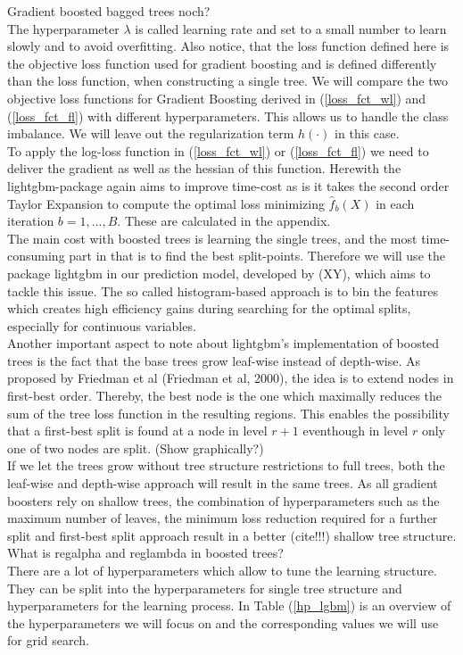 \documentclass[12pt,titlepage]{article}
\begin{document}
Gradient boosted bagged trees noch? \\

The hyperparameter $\lambda$ is called learning rate and set to a small number to learn slowly and to avoid overfitting. Also notice, that the loss function defined here is the objective loss function used for gradient boosting and is defined differently than the loss function, when constructing a single tree. We will compare the two objective loss functions for Gradient Boosting derived in (\ref{loss_fct_wl}) and (\ref{loss_fct_fl}) with different hyperparameters. This allows us to handle the class imbalance. We will leave out the regularization term $h(\cdot)$ in this case.\\
To apply the log-loss function in (\ref{loss_fct_wl}) or (\ref{loss_fct_fl}) we need to deliver the gradient as well as the hessian of this function. Herewith the lightgbm-package again aims to improve time-cost as is it takes the second order Taylor Expansion to compute the optimal loss minimizing $\hat{f}_{b}(X)$ in each iteration $b=1,...,B$. These are calculated in the appendix. \\
The main cost with boosted trees is learning the single trees, and the most time-consuming part in that is to find the best split-points. Therefore we will use the package lightgbm in our prediction model, developed by (XY), which aims to tackle this issue. The so called histogram-based approach is to bin the features which creates high efficiency gains during searching for the optimal splits, especially for continuous variables. \\
Another important aspect to note about lightgbm's implementation of boosted trees is the fact that the base trees grow leaf-wise instead of depth-wise. As proposed by Friedman et al (Friedman et al, 2000), the idea is to extend nodes in first-best order. Thereby, the best node is the one which maximally reduces the sum of the tree loss function in the resulting regions. This enables the possibility that a first-best split is found at a node in level $r+1$ eventhough in level $r$ only one of two nodes are split. (Show graphically?) \\
If we let the trees grow without tree structure restrictions to full trees, both the leaf-wise and depth-wise approach will result in the same trees. As all gradient boosters rely on shallow trees, the combination of hyperparameters such as the maximum number of leaves, the minimum loss reduction required for a further split and first-best split approach result in a better (cite!!!) shallow tree structure. \\
What is regalpha and reglambda in boosted trees? \\
There are a lot of hyperparameters which allow to tune the learning structure. They can be split into the hyperparameters for single tree structure and hyperparameters for the learning process. In Table (\ref{hp_lgbm}) is an overview of the hyperparameters we will focus on and the corresponding values we will use for grid search. \\
\end{document}
